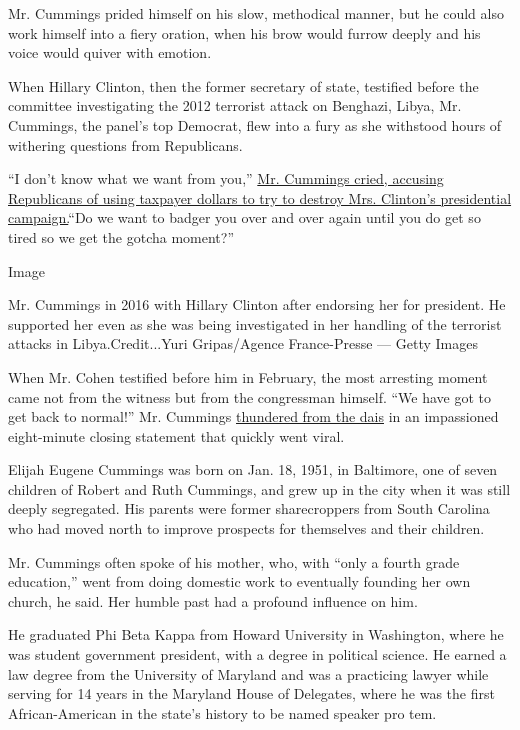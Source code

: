 Mr. Cummings prided himself on his slow, methodical manner, but he could
also work himself into a fiery oration, when his brow would furrow
deeply and his voice would quiver with emotion.

When Hillary Clinton, then the former secretary of state, testified
before the committee investigating the 2012 terrorist attack on
Benghazi, Libya, Mr. Cummings, the panel's top Democrat, flew into a
fury as she withstood hours of withering questions from Republicans.

``I don't know what we want from you,''
\href{https://www.nytimes.com/2019/10/17/us/politics/elijah-cummings-death-illness.html?action=click\&module=Top\%20Stories\&pgtype=Homepage}{Mr.
Cummings cried, accusing Republicans of using taxpayer dollars to try to
destroy Mrs. Clinton's presidential campaign.}``Do we want to badger you
over and over again until you do get so tired so we get the gotcha
moment?''

Image

Mr. Cummings in 2016 with Hillary Clinton after endorsing her for
president. He supported her even as she was being investigated in her
handling of the terrorist attacks in Libya.Credit...Yuri Gripas/Agence
France-Presse --- Getty Images

When Mr. Cohen testified before him in February, the most arresting
moment came not from the witness but from the congressman himself. ``We
have got to get back to normal!'' Mr. Cummings
\href{https://www.youtube.com/watch?v=AAdmsSJXn68}{thundered from the
dais} in an impassioned eight-minute closing statement that quickly went
viral.

Elijah Eugene Cummings was born on Jan. 18, 1951, in Baltimore, one of
seven children of Robert and Ruth Cummings, and grew up in the city when
it was still deeply segregated. His parents were former sharecroppers
from South Carolina who had moved north to improve prospects for
themselves and their children.

Mr. Cummings often spoke of his mother, who, with ``only a fourth grade
education,'' went from doing domestic work to eventually founding her
own church, he said. Her humble past had a profound influence on him.

He graduated Phi Beta Kappa from Howard University in Washington, where
he was student government president, with a degree in political science.
He earned a law degree from the University of Maryland and was a
practicing lawyer while serving for 14 years in the Maryland House of
Delegates, where he was the first African-American in the state's
history to be named speaker pro tem.

